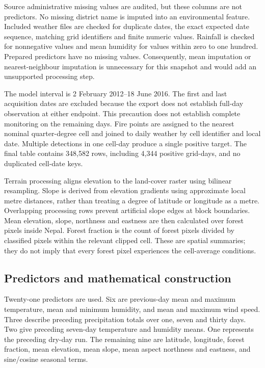 \documentclass[conference,a4paper]{IEEEtran}
\begin{document}
Source administrative missing values are audited, but these columns are not predictors. No missing district name is imputed into an environmental feature. Included weather files are checked for duplicate dates, the exact expected date sequence, matching grid identifiers and finite numeric values. Rainfall is checked for nonnegative values and mean humidity for values within zero to one hundred. Prepared predictors have no missing values. Consequently, mean imputation or nearest-neighbour imputation is unnecessary for this snapshot and would add an unsupported processing step.

The model interval is 2 February 2012--18 June 2016. The first and last acquisition dates are excluded because the export does not establish full-day observation at either endpoint. This precaution does not establish complete monitoring on the remaining days. Fire points are assigned to the nearest nominal quarter-degree cell and joined to daily weather by cell identifier and local date. Multiple detections in one cell-day produce a single positive target. The final table contains 348,582 rows, including 4,344 positive grid-days, and no duplicated cell-date keys.

Terrain processing aligns elevation to the land-cover raster using bilinear resampling. Slope is derived from elevation gradients using approximate local metre distances, rather than treating a degree of latitude or longitude as a metre. Overlapping processing rows prevent artificial slope edges at block boundaries. Mean elevation, slope, northness and eastness are then calculated over forest pixels inside Nepal. Forest fraction is the count of forest pixels divided by classified pixels within the relevant clipped cell. These are spatial summaries; they do not imply that every forest pixel experiences the cell-average conditions.

\subsection{Predictors and mathematical construction}
Twenty-one predictors are used. Six are previous-day mean and maximum temperature, mean and minimum humidity, and mean and maximum wind speed. Three describe preceding precipitation totals over one, seven and thirty days. Two give preceding seven-day temperature and humidity means. One represents the preceding dry-day run. The remaining nine are latitude, longitude, forest fraction, mean elevation, mean slope, mean aspect northness and eastness, and sine/cosine seasonal terms.
\end{document}
